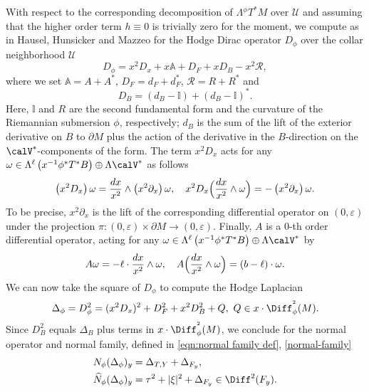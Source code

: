 With respect to the corresponding decomposition of $\Lambda {}^\phi T^*M$ over $\mathscr{U}$
and assuming that the higher order term $h\equiv 0$ is trivially zero for the moment, we compute as in Hausel, Hunsicker and Mazzeo \cite[\S 5.3.2]{gravi-ins} for the Hodge Dirac operator $D_\phi$ over the collar neighborhood $\mathscr{U}$
\begin{equation}\label{hodge de rham}
D_\phi = x^{2}D_{x} + x \mathbb{A} + D_{F} + xD_{B}
-x^{2}\mathscr{R},
\end{equation}
where we set $\mathbb{A} = A + A^{*}$, $D_{F} = d_{F} + d_{F}^{*}$, $\mathscr{R} = R + R^{*}$ and
\begin{equation}\label{DB}
D_{B} = \left(d_{B} - \mathbb{I} \right) + \left(d_{B} - \mathbb{I} \right)^*.
\end{equation}
Here, $\mathbb{I}$ and $R$ are the second fundamental form and the curvature of
the Riemannian submersion $\phi$, respectively; $d_B$ is the sum of the lift of the exterior derivative on $B$ to $\partial M$
plus the action of the derivative in the $B$-direction on
the $\calV^*$-components of the form. The term $x^{2}D_{x}$
acts for any $\omega \in \Lambda^\ell \left(x^{-1} \phi^*T^*B\right) \oplus \Lambda \calV^*$ as follows
\[
\left(x^{2}D_{x}\right) \omega = \frac{dx}{x^2} \wedge \left(x^{2}\partial_{x} \right) \omega, \quad
x^{2}D_{x} \Bigl(\frac{dx}{x^2} \wedge \omega \Bigr) = -\left(x^{2}\partial_{x} \right) \omega.
\]
To be precise, $x^2\partial_x$ is the lift of the corresponding differential operator
on $(0,\varepsilon)$ under the projection $\pi: (0,\varepsilon) \times
\partial M \to (0,\varepsilon)$. Finally, $A$ is a $0$-th order differential operator, acting for any
$\omega \in \Lambda^\ell \left(x^{-1} \phi^*T^*B\right) \oplus \Lambda \calV^*$ by
\[
A \omega = -\ell \cdot \frac{dx}{x^2} \wedge \omega, \quad
A \Bigl(\frac{dx}{x^2} \wedge \omega \Bigr) = (b-\ell) \cdot \omega.
\]
We can now take the square of $D_\phi$ to compute the Hodge Laplacian
\begin{equation}\label{hodge laplace}\begin{split}
\Delta_{\phi} = D^2_\phi = (x^{2}D_{x})^2 + D^2_{F} + x^2D^2_{B}
+Q, \ Q \in x\cdot \Diff^{^2}_{\phi}(M).
\end{split}\end{equation}
Since $D^2_B$ equals $\Delta_B$ plus terms in $x\cdot \Diff^{^2}_{\phi}(M)$, we conclude
for the normal operator and normal family, defined in \eqref{eqn:normal family def}, \eqref{normal-family}
\begin{align}
\label{eqn:normal op Delta}
N_\phi(\Delta_{\phi})_{y} &= \Delta_{T,Y} + \Delta_{F_y},
\\
\label{NP}
\widehat{N}_{\phi}(\Delta_{\phi})_{y} &= \tau^2 + \vert \xi \vert^{2}
+ \Delta_{F_y} \in \Diff^{2}(F_y).
\end{align}
